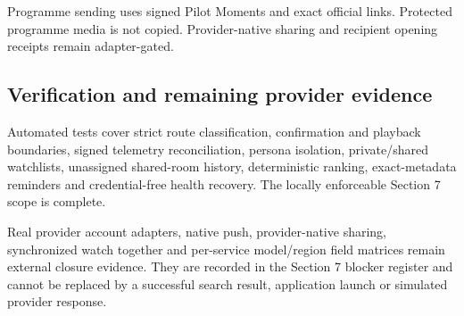 Programme sending uses signed Pilot Moments and exact official links.  Protected programme
media is not copied.  Provider-native sharing and recipient opening receipts remain
adapter-gated.

\subsection{Verification and remaining provider evidence}

Automated tests cover strict route classification, confirmation and playback boundaries,
signed telemetry reconciliation, persona isolation, private/shared watchlists, unassigned
shared-room history, deterministic ranking, exact-metadata reminders and credential-free
health recovery.  The locally enforceable Section 7 scope is complete.

Real provider account adapters, native push, provider-native sharing, synchronized watch
together and per-service model/region field matrices remain external closure evidence.
They are recorded in the Section 7 blocker register and cannot be replaced by a successful
search result, application launch or simulated provider response.
